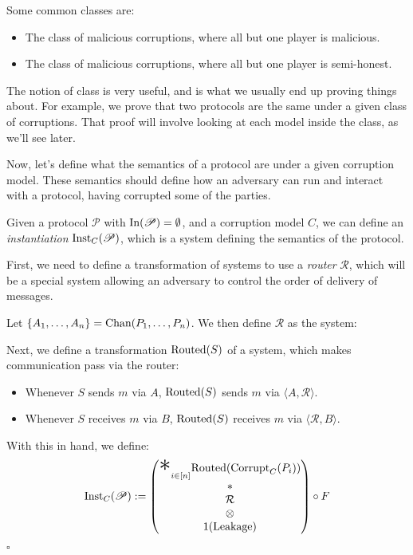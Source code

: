 Some common classes are:
\begin{itemize}
  \item The class of malicious corruptions, where all but one player is malicious.
  \item The class of malicious corruptions, where all but one player is semi-honest.
\end{itemize}

The notion of class is very useful, and is what we usually end up proving
things about.
For example, we prove that two protocols are the same under a given
class of corruptions.
That proof will involve looking at each model inside the class,
as we'll see later.

Now, let's define what the semantics of a protocol are under
a given corruption model.
These semantics should define how an adversary can run and interact
with a protocol, having corrupted some of the parties.

\begin{definition}[Instantiation]
  Given a protocol $\mathscr{P}$ with $\text{In}(\mathscr{P}) = \emptyset$, and a corruption model $C$, we can
  define an \emph{instantiation} $\text{Inst}_C(\mathscr{P})$, which
  is a system defining the semantics of the protocol.

  First, we need to define a transformation of systems to use
  a \emph{router} $\mathcal{R}$, which will be a special system
  allowing an adversary to control the order of delivery of messages.

  Let $\{A_1, \ldots, A_n\} = \text{Chan}(P_1, \ldots, P_n)$.
  We then define $\mathcal{R}$ as the system:

  Next, we define a transformation $\text{Routed}(S)$ of a system,
  which makes communication pass via the router:
  \begin{itemize}
    \item Whenever $S$ sends $m$ via $A$, $\text{Routed}(S)$ sends $m$ via $\langle A , \mathcal{R} \rangle$.
    \item Whenever $S$ receives $m$ via $B$, $\text{Routed}(S)$ receives $m$ via $\langle \mathcal{R}, B \rangle$.
  \end{itemize}

With this in hand, we define:
$$
\tx{Inst}_C(\mathscr{P}) :=
  \begin{pmatrix}
    {\displaystyle \bigast}_{i \in [n]} \tx{Routed}(\tx{Corrupt}_C(P_i))\cr
    *\cr
    \mathcal{R}\cr
    \otimes\cr
    1(\tx{Leakage})
  \end{pmatrix}
  \circ F
$$


$\square$
\end{definition}

